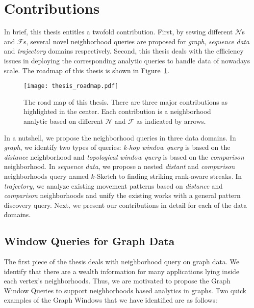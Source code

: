 \section{Contributions}
In brief, this thesis entitles a twofold contribution.
First, by sewing different $\mathcal{N}$s and $\mathcal{F}$s, 
several novel neighborhood queries are proposed for 
\emph{graph}, \emph{sequence data} and \emph{trajectory} domains respectively. 
Second, this thesis
deals with the efficiency issues in deploying the corresponding analytic queries to
handle data of nowadays scale.
The roadmap of this thesis is shown in Figure~\ref{fig:thesis_roadmap}.
\begin{figure}[h]
\centering
\texttt{[image: thesis\_roadmap.pdf]}
\caption{The road map of this thesis. There are three major contributions as highlighted in the center. Each contribution
is a neighborhood analytic based on different $\mathcal{N}$ and $\mathcal{F}$ as indicated by arrows.} 
\label{fig:thesis_roadmap}
\end{figure}

In a nutshell, we propose the neighborhood queries in three data domains. 
In \emph{graph}, we identify two types of queries: \emph{k-hop window query} is based on the \emph{distance} neighborhood
and \emph{topological window query} is based on the \emph{comparison} neighborhood. 
In \emph{sequence data}, we propose a nested \emph{distant} and \emph{comparison} neighborhoods
query named $k$-Sketch to finding striking rank-aware streaks.
In \emph{trajectory}, we analyze existing movement patterns based
on \emph{distance} and \emph{comparison} neighborhoods and unify
the existing works with a general pattern discovery query. Next, we present our contributions in detail for each of the data domains.


\subsection{Window Queries for Graph Data}
The first piece of the thesis deals with neighborhood query
on graph data. We identify that there are a wealth information for many applications lying inside each vertex's neighborhoods. Thus, we are motivated to propose the Graph Window Queries to support neighborhoods based analytics in graphs. Two quick examples of the Graph Windows that we have identified are as follows:

